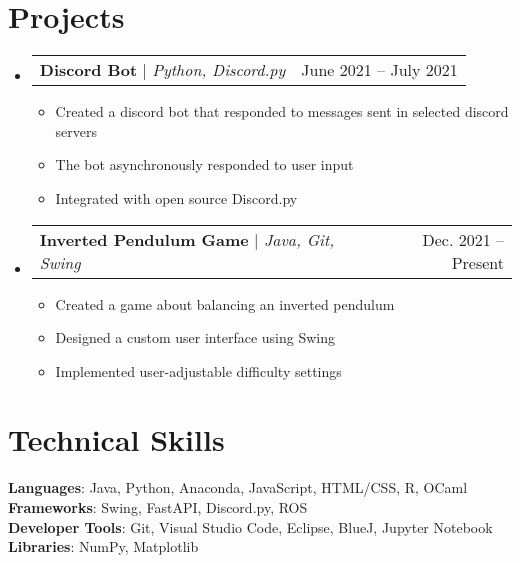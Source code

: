 \documentclass[letterpaper,11pt]{article}
\makeatletter
\newcommand{\resumeItem}[1]{
  \item\small{
    {#1 \vspace{-2pt}}
  }
}
\newcommand{\resumeProjectHeading}[2]{
    \item
    \begin{tabular*}{0.97\textwidth}{l@{\extracolsep{\fill}}r}
      \small#1 & #2 \\
    \end{tabular*}\vspace{-7pt}
}
\newcommand{\resumeSubHeadingListStart}{\begin{itemize}[leftmargin=0.15in, label={}]}
\newcommand{\resumeSubHeadingListEnd}{\end{itemize}}
\newcommand{\resumeItemListStart}{\begin{itemize}}
\newcommand{\resumeItemListEnd}{\end{itemize}\vspace{-5pt}}
\makeatother
\begin{document}
\section{Projects}
    \resumeSubHeadingListStart
      \resumeProjectHeading
          {\textbf{Discord Bot} $|$ \emph{Python, Discord.py}}{June 2021 -- July 2021}
          \resumeItemListStart
            \resumeItem{Created a discord bot that responded to messages sent in selected discord servers}
            \resumeItem{The bot asynchronously responded to user input}
            \resumeItem{Integrated with open source Discord.py}
          \resumeItemListEnd
      \resumeProjectHeading
          {\textbf{Inverted Pendulum Game} $|$ \emph{Java, Git, Swing}}{Dec. 2021 -- Present}
          \resumeItemListStart
            \resumeItem{Created a game about balancing an inverted pendulum}
            \resumeItem{Designed a custom user interface using Swing}
            \resumeItem{Implemented user-adjustable difficulty settings}
          \resumeItemListEnd
    \resumeSubHeadingListEnd



%
\section{Technical Skills}
 \begin{itemize}[leftmargin=0.15in, label={}]
    \small{\item{
     \textbf{Languages}{: Java, Python, Anaconda, JavaScript, HTML/CSS, R, OCaml} \\
     \textbf{Frameworks}{: Swing, FastAPI, Discord.py, ROS} \\
     \textbf{Developer Tools}{: Git, Visual Studio Code, Eclipse, BlueJ, Jupyter Notebook} \\
     \textbf{Libraries}{: NumPy, Matplotlib}
    }}
 \end{itemize}


\end{document}

